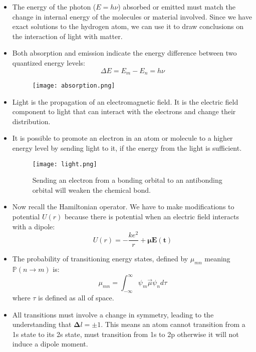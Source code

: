 \documentclass[12pt, letterpaper, twoside]{article}
\begin{document}
\begin{itemize}
    \item The energy of the photon ($E = h\nu$) absorbed or emitted must match the change in internal energy of the molecules or material involved. Since we have exact solutions to the hydrogen atom, we can use it to draw conclusions on the interaction of light with matter.
    \item Both absorption and emission indicate the energy difference between two quantized energy levels:
    \begin{equation*}
        \Delta E = E_m - E_n = h\nu
    \end{equation*}
    \begin{figure}[!ht]
        \centering
        \texttt{[image: absorption.png]}
    \end{figure}
    \item Light is the propagation of an electromagnetic field. It is the electric field component to light that can interact with the electrons and change their distribution. 
    \item It is possible to promote an electron in an atom or molecule to a higher energy level by sending light to it, if the energy from the light is sufficient.
    \begin{figure}[!ht]
        \centering
        \texttt{[image: light.png]}
        \caption{Sending an electron from a bonding orbital to an antibonding orbital will weaken the chemical bond.}
    \end{figure}
    \item Now recall the Hamiltonian operator. We have to make modifications to potential $U(r)$ because there is potential when an electric field interacts with a dipole:
    \begin{equation*}
        U(r) = -\frac{ke^2}{r} + \mathbf{\mu E(t)}
    \end{equation*}
    \item The probability of transitioning energy states, defined by $\mu_{mn}$ meaning $\mathbb{P}(n \rightarrow m)$ is:
    \begin{equation}
        \mu_{mn} = \int_{-\infty}^{\infty}\psi_m\vec{\mu}\psi_nd\tau
    \end{equation}
    where $\tau$ is defined as all of space.
    \item All transitions must involve a change in symmetry, leading to the understanding that $\mathbf{\Delta}l = \pm 1$. This means an atom cannot transition from a 1s state to its 2s state, must transition from 1s to 2p otherwise it will not induce a dipole moment.
\end{itemize}
\end{document}
